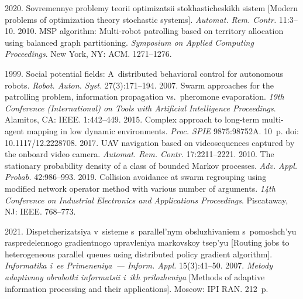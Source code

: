 \begin{multicols}{2}
{{\begin{thebibliography}{99}
 2020. Sovremennye problemy teorii optimizatsii 
stokhasticheskikh sistem [Modern problems of optimization theory stochastic systems]. 
\textit{Automat. Rem. Contr.} 11:3--10.
 2010. MSP algorithm: Multi-robot patrolling based on 
territory allocation using balanced graph partitioning. \textit{Symposium on Applied Computing 
Proceedings}. New York, NY: ACM. 1271--1276.

 1999. Social potential fields: A~distributed behavioral control for 
autonomous robots. \textit{Robot. Auton. Syst.} 27(3):171--194.
 2007. 
Swarm approaches for the patrolling problem, information propagation vs.\ pheromone 
evaporation.  \textit{19th Conference (International) on Tools with Artificial Intelligence 
Proceedings}. Alamitos, CA: IEEE. 1:442--449. 
 2015. Complex approach to long-term multi-agent 
mapping in low dynamic environments. \textit{Proc. SPIE} 9875:98752A. 10~p. doi: 10.1117/12.2228708.
 2017. UAV 
navigation based on videosequences captured by the onboard video camera. \textit{Automat. 
Rem. Contr.} 17:2211--2221. 
 2010. The stationary probability density of a class of 
bounded Markov processes. \textit{Adv. Appl. Probab.} 42:986--993. 
 2019. Collision avoidance at swarm 
regrouping using modified network operator method with various number of arguments. 
\textit{14th Conference on Industrial Electronics and Applications Proceedings}.  Piscataway, NJ: IEEE.  
768--773. 


 2021. Dis\-pet\-che\-ri\-za\-tsiya v~sisteme s~parallel'nym 
obsluzhivaniem s~po\-moshch'yu ras\-pre\-de\-len\-no\-go gra\-di\-ent\-no\-go up\-rav\-le\-niya mar\-kov\-skoy 
tsep'yu [Routing jobs to heterogeneous parallel queues using distributed policy gradient 
algorithm]. \textit{Informatika i~ee Primeneniya~--- Inform. Appl.} 15(3):41--50. 
 2007. \textit{Metody adaptivnoy obrabotki informatsii i~ikh 
prilozheniya} [Methods of adaptive information processing and their applications]. Moscow: IPI 
RAN. 212~p. 

\end{thebibliography}

 }
 }

\end{multicols}

